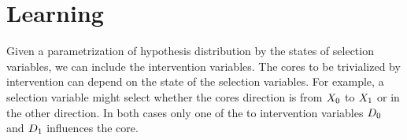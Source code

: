 \section{Learning}

Given a parametrization of hypothesis distribution by the states of selection variables, we can include the intervention variables.
The cores to be trivialized by intervention can depend on the state of the selection variables.
For example, a selection variable might select whether the cores direction is from $X_{0}$ to $X_{1}$ or in the other direction.
In both cases only one of the to intervention variables $D_{0}$ and $D_{1}$ influences the core.